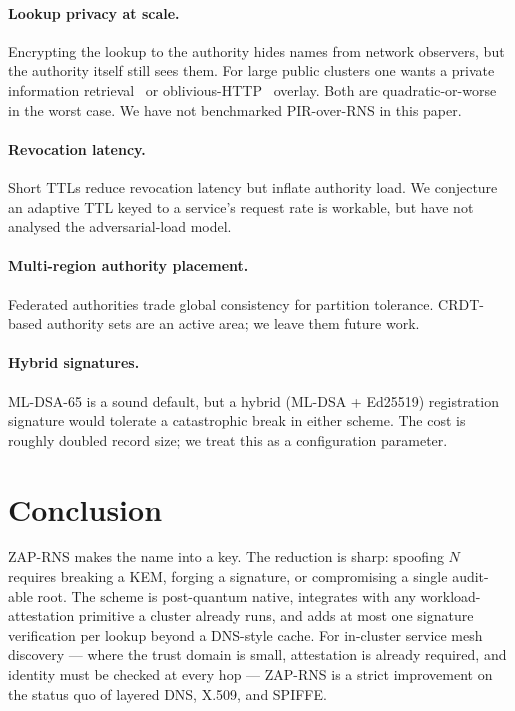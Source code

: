 \documentclass[11pt,a4paper]{article}
\theoremstyle{definition}
\theoremstyle{remark}
\newcommand{\RNS}{\textsc{ZAP-RNS}}
\begin{document}
\paragraph{Lookup privacy at scale.} Encrypting the lookup to the
authority hides names from network observers, but the authority itself
still sees them. For large public clusters one wants a private
information retrieval~\cite{chor1995pir} or oblivious-HTTP~\cite{ohttp}
overlay. Both are quadratic-or-worse in the worst case. We have not
benchmarked PIR-over-RNS in this paper.

\paragraph{Revocation latency.} Short TTLs reduce revocation latency
but inflate authority load. We conjecture an adaptive TTL keyed to a
service's request rate is workable, but have not analysed the
adversarial-load model.

\paragraph{Multi-region authority placement.} Federated authorities
trade global consistency for partition tolerance. CRDT-based
authority sets are an active area; we leave them future work.

\paragraph{Hybrid signatures.} ML-DSA-65 is a sound default, but a
hybrid (ML-DSA + Ed25519) registration signature would tolerate a
catastrophic break in either scheme. The cost is roughly doubled
record size; we treat this as a configuration parameter.

\section{Conclusion}

\RNS{} makes the name into a key. The reduction is sharp: spoofing
$N$ requires breaking a KEM, forging a signature, or compromising a
single audit-able root. The scheme is post-quantum native, integrates
with any workload-attestation primitive a cluster already runs, and
adds at most one signature verification per lookup beyond a
DNS-style cache. For in-cluster service mesh discovery --- where the
trust domain is small, attestation is already required, and identity
must be checked at every hop --- \RNS{} is a strict improvement on the
status quo of layered DNS, X.509, and SPIFFE.



\end{document}
